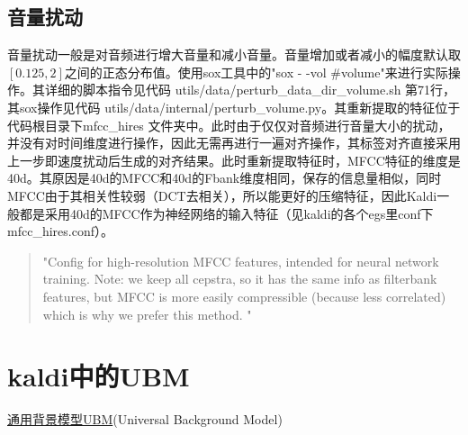 \subsection{音量扰动}
音量扰动一般是对音频进行增大音量和减小音量。音量增加或者减小的幅度默认取$[0.125, 2]$之间的正态分布值。使用sox工具中的"sox - -vol #volume"来进行实际操作。其详细的脚本指令见代码 utils/data/perturb\_data\_dir\_volume.sh 第71行，其sox操作见代码 utils/data/internal/perturb\_volume.py。其重新提取的特征位于代码根目录下mfcc\_hires 文件夹中。此时由于仅仅对音频进行音量大小的扰动，并没有对时间维度进行操作，因此无需再进行一遍对齐操作，其标签对齐直接采用上一步即速度扰动后生成的对齐结果。此时重新提取特征时，MFCC特征的维度是40d。其原因是40d的MFCC和40d的Fbank维度相同，保存的信息量相似，同时MFCC由于其相关性较弱（DCT去相关），所以能更好的压缩特征，因此Kaldi一般都是采用40d的MFCC作为神经网络的输入特征（见kaldi的各个egs里conf下mfcc\_hires.conf）。
\begin{quotation}
"Config for high-resolution MFCC features, intended for neural network training. Note: we keep all cepstra, so it has the same info as filterbank features, but MFCC is more easily compressible (because less correlated) which is why we prefer this method. "
\end{quotation}

\section{kaldi中的UBM}

\href{http://citeseerx.ist.psu.edu/viewdoc/download?doi=10.1.1.117.338&rep=rep1&type=pdf}{通用背景模型UBM}(Universal Background Model)